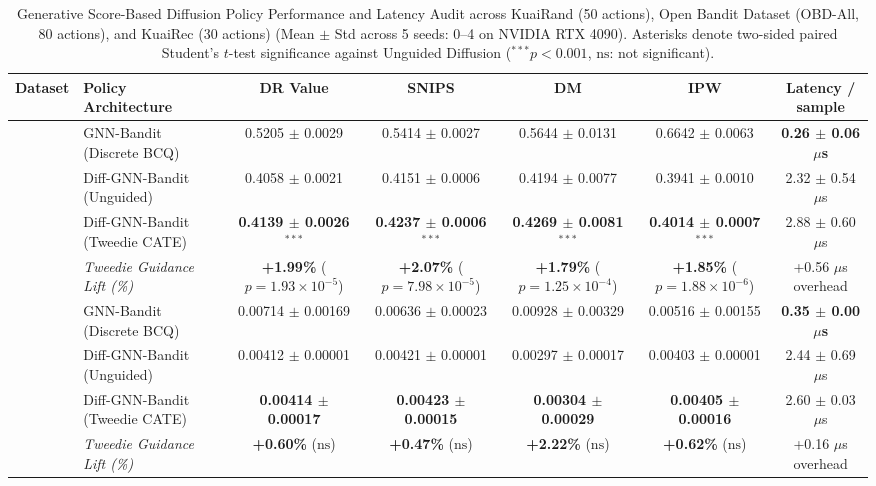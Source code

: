 \documentclass[preprint,12pt,3p]{elsarticle}
\begin{document}
\begin{table}[t]
\centering
\small
\caption{Generative Score-Based Diffusion Policy Performance and Latency Audit across KuaiRand (50 actions), Open Bandit Dataset (OBD-All, 80 actions), and KuaiRec (30 actions) (Mean $\pm$ Std across 5 seeds: 0--4 on NVIDIA RTX 4090). Asterisks denote two-sided paired Student's $t$-test significance against Unguided Diffusion ($^{***}p < 0.001$, $\text{ns}$: not significant).}
\label{tab:diffusion_audit}
\begin{tabular*}{\textwidth}{@{\extracolsep{\fill}}llccccc@{}}
\toprule
\textbf{Dataset} & \textbf{Policy Architecture} & \textbf{DR Value} & \textbf{SNIPS} & \textbf{DM} & \textbf{IPW} & \textbf{Latency / sample} \\
\midrule
{} 
& GNN-Bandit (Discrete BCQ) & 0.5205 $\pm$ 0.0029 & 0.5414 $\pm$ 0.0027 & 0.5644 $\pm$ 0.0131 & 0.6642 $\pm$ 0.0063 & \textbf{0.26 $\pm$ 0.06 $\mu$s} \\
& Diff-GNN-Bandit (Unguided) & 0.4058 $\pm$ 0.0021 & 0.4151 $\pm$ 0.0006 & 0.4194 $\pm$ 0.0077 & 0.3941 $\pm$ 0.0010 & 2.32 $\pm$ 0.54 $\mu$s \\
& Diff-GNN-Bandit (Tweedie CATE) & \textbf{0.4139 $\pm$ 0.0026}$^{***}$ & \textbf{0.4237 $\pm$ 0.0006}$^{***}$ & \textbf{0.4269 $\pm$ 0.0081}$^{***}$ & \textbf{0.4014 $\pm$ 0.0007}$^{***}$ & 2.88 $\pm$ 0.60 $\mu$s \\
& \textit{Tweedie Guidance Lift (\%)} & \textbf{+1.99\%} ($p=1.93\times 10^{-5}$) & \textbf{+2.07\%} ($p=7.98\times 10^{-5}$) & \textbf{+1.79\%} ($p=1.25\times 10^{-4}$) & \textbf{+1.85\%} ($p=1.88\times 10^{-6}$) & +0.56 $\mu$s overhead \\
\midrule
{} 
& GNN-Bandit (Discrete BCQ) & 0.00714 $\pm$ 0.00169 & 0.00636 $\pm$ 0.00023 & 0.00928 $\pm$ 0.00329 & 0.00516 $\pm$ 0.00155 & \textbf{0.35 $\pm$ 0.00 $\mu$s} \\
& Diff-GNN-Bandit (Unguided) & 0.00412 $\pm$ 0.00001 & 0.00421 $\pm$ 0.00001 & 0.00297 $\pm$ 0.00017 & 0.00403 $\pm$ 0.00001 & 2.44 $\pm$ 0.69 $\mu$s \\
& Diff-GNN-Bandit (Tweedie CATE) & \textbf{0.00414 $\pm$ 0.00017} & \textbf{0.00423 $\pm$ 0.00015} & \textbf{0.00304 $\pm$ 0.00029} & \textbf{0.00405 $\pm$ 0.00016} & 2.60 $\pm$ 0.03 $\mu$s \\
& \textit{Tweedie Guidance Lift (\%)} & \textbf{+0.60\%} ($\text{ns}$) & \textbf{+0.47\%} ($\text{ns}$) & \textbf{+2.22\%} ($\text{ns}$) & \textbf{+0.62\%} ($\text{ns}$) & +0.16 $\mu$s overhead \\

\end{tabular*}
\end{table}
\end{document}
